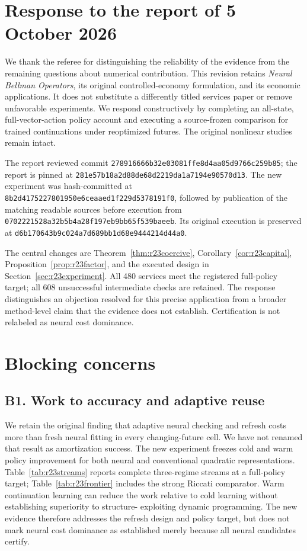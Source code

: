 \section*{Response to the report of 5 October 2026}
We thank the referee for distinguishing the reliability of the evidence from
the remaining questions about numerical contribution. This revision retains
\emph{Neural Bellman Operators}, its original controlled-economy formulation,
and its economic applications. It does not substitute a differently titled
services paper or remove unfavorable experiments. We respond constructively
by completing an all-state, full-vector-action policy account and executing
a source-frozen comparison for trained continuations under reoptimized
futures. The original nonlinear studies remain intact.

The report reviewed commit
\texttt{278916666b32e03081ffe8d4aa05d9766c259b85}; the report is pinned at
\texttt{281e57b18a2d88de68d2219da1a7194e90570d13}. The new experiment was
hash-committed at
\texttt{8b2d4175227801950e6ceaaed1f229d5378191f0}, followed by publication of
the matching readable sources before execution from
\texttt{0702221528a32b5b4a28f197eb9bb65f539baeeb}. Its original execution is
preserved at
\texttt{d6b170643b9c024a7d689bb1d68e9444214d44a0}.

The central changes are Theorem~\ref{thm:r23coercive},
Corollary~\ref{cor:r23capital}, Proposition~\ref{prop:r23factor}, and the
executed design in Section~\ref{sec:r23experiment}. All 480 services meet the
registered full-policy target; all 608 unsuccessful intermediate checks are
retained. The response distinguishes an objection resolved for this precise
application from a broader method-level claim that the evidence does not
establish. Certification is not relabeled as neural cost dominance.

\section*{Blocking concerns}
\subsection*{B1. Work to accuracy and adaptive reuse}
We retain the original finding that adaptive neural checking and refresh
costs more than fresh neural fitting in every changing-future cell. We have
not renamed that result as amortization success. The new experiment freezes
cold and warm policy improvement for both neural and conventional quadratic
representations. Table~\ref{tab:r23streams} reports complete three-regime
streams at a full-policy target; Table~\ref{tab:r23frontier} includes the
strong Riccati comparator. Warm continuation learning can reduce the work
relative to cold learning without establishing superiority to structure-
exploiting dynamic programming. The new evidence therefore addresses the
refresh design and policy target, but does not mark neural cost dominance
as established merely because all neural candidates certify.

